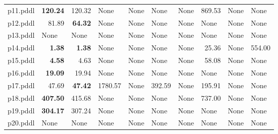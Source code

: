 \documentclass{article}
\begin{document}
\begin{tabular}{@{}lrrrrrrrrr@{}}
p11.pddl & \textbf{120.24} & 120.32 & \multicolumn{1}{|l|}{None} & \multicolumn{1}{|l|}{None} & \multicolumn{1}{|l|}{None} & \multicolumn{1}{|l|}{None} & 869.53 & \multicolumn{1}{|l|}{None} & \multicolumn{1}{|l|}{None} \\
p12.pddl & 81.89 & \textbf{64.32} & \multicolumn{1}{|l|}{None} & \multicolumn{1}{|l|}{None} & \multicolumn{1}{|l|}{None} & \multicolumn{1}{|l|}{None} & \multicolumn{1}{|l|}{None} & \multicolumn{1}{|l|}{None} & \multicolumn{1}{|l|}{None} \\
p13.pddl & \multicolumn{1}{|l|}{None} & \multicolumn{1}{|l|}{None} & \multicolumn{1}{|l|}{None} & \multicolumn{1}{|l|}{None} & \multicolumn{1}{|l|}{None} & \multicolumn{1}{|l|}{None} & \multicolumn{1}{|l|}{None} & \multicolumn{1}{|l|}{None} & \multicolumn{1}{|l|}{None} \\
p14.pddl & \textbf{1.38} & \textbf{1.38} & \multicolumn{1}{|l|}{None} & \multicolumn{1}{|l|}{None} & \multicolumn{1}{|l|}{None} & \multicolumn{1}{|l|}{None} & 25.36 & \multicolumn{1}{|l|}{None} & 554.00 \\
p15.pddl & \textbf{4.58} & 4.63 & \multicolumn{1}{|l|}{None} & \multicolumn{1}{|l|}{None} & \multicolumn{1}{|l|}{None} & \multicolumn{1}{|l|}{None} & 58.08 & \multicolumn{1}{|l|}{None} & \multicolumn{1}{|l|}{None} \\
p16.pddl & \textbf{19.09} & 19.94 & \multicolumn{1}{|l|}{None} & \multicolumn{1}{|l|}{None} & \multicolumn{1}{|l|}{None} & \multicolumn{1}{|l|}{None} & \multicolumn{1}{|l|}{None} & \multicolumn{1}{|l|}{None} & \multicolumn{1}{|l|}{None} \\
p17.pddl & 47.69 & \textbf{47.42} & 1780.57 & \multicolumn{1}{|l|}{None} & 392.59 & \multicolumn{1}{|l|}{None} & 195.91 & \multicolumn{1}{|l|}{None} & \multicolumn{1}{|l|}{None} \\
p18.pddl & \textbf{407.50} & 415.68 & \multicolumn{1}{|l|}{None} & \multicolumn{1}{|l|}{None} & \multicolumn{1}{|l|}{None} & \multicolumn{1}{|l|}{None} & 737.00 & \multicolumn{1}{|l|}{None} & \multicolumn{1}{|l|}{None} \\
p19.pddl & \textbf{304.17} & 307.24 & \multicolumn{1}{|l|}{None} & \multicolumn{1}{|l|}{None} & \multicolumn{1}{|l|}{None} & \multicolumn{1}{|l|}{None} & \multicolumn{1}{|l|}{None} & \multicolumn{1}{|l|}{None} & \multicolumn{1}{|l|}{None} \\
p20.pddl & \multicolumn{1}{|l|}{None} & \multicolumn{1}{|l|}{None} & \multicolumn{1}{|l|}{None} & \multicolumn{1}{|l|}{None} & \multicolumn{1}{|l|}{None} & \multicolumn{1}{|l|}{None} & \multicolumn{1}{|l|}{None} & \multicolumn{1}{|l|}{None} & \multicolumn{1}{|l|}{None} \\
\end{tabular}
\end{document}
